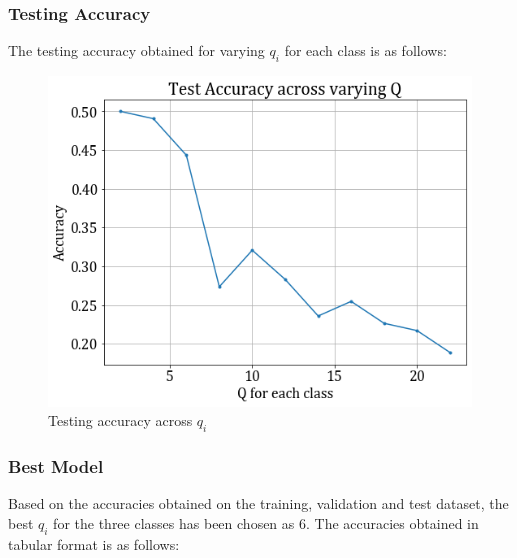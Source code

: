 \documentclass[11pt,a4paper]{article}
\begin{document}
\subsubsection{Testing Accuracy}
The testing accuracy obtained for varying $q_i$ for each class is as follows:
\begin{figure}[H]
    \centering
    \includegraphics[scale=0.5]{images/2A/2A_full_test_acc.png}
    \caption{Testing accuracy across $q_i$}
\end{figure}

\subsubsection{Best Model}
Based on the accuracies obtained on the training, validation and test dataset, the best $q_i$ for the three classes has been chosen as $6$. The accuracies obtained in tabular format is as follows:

\end{document}
